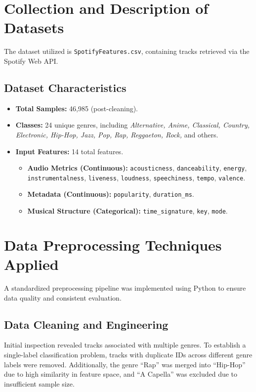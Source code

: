 \documentclass[12pt, a4paper]{article}
\begin{document}
\section{Collection and Description of Datasets}
The dataset utilized is \texttt{SpotifyFeatures.csv}, containing tracks retrieved via the Spotify Web API.

\subsection{Dataset Characteristics}
\begin{itemize}
    \item \textbf{Total Samples:} 46,985 (post-cleaning).
    \item \textbf{Classes:} 24 unique genres, including \textit{Alternative, Anime, Classical, Country, Electronic, Hip-Hop, Jazz, Pop, Rap, Reggaeton, Rock,} and others.
    \item \textbf{Input Features:} 14 total features.
    {\raggedright
    \begin{itemize}
        \item \textbf{Audio Metrics (Continuous):} \texttt{acousticness}, \texttt{danceability}, \texttt{energy}, \texttt{instrumentalness}, \texttt{liveness}, \texttt{loudness}, \texttt{speechiness}, \texttt{tempo}, \texttt{valence}.
        \item \textbf{Metadata (Continuous):} \texttt{popularity}, \texttt{duration\_ms}.
        \item \textbf{Musical Structure (Categorical):} \texttt{time\_signature}, \texttt{key}, \texttt{mode}.
    \end{itemize}
    }
\end{itemize}

\section{Data Preprocessing Techniques Applied}
A standardized preprocessing pipeline was implemented using Python to ensure data quality and consistent evaluation.

\subsection{Data Cleaning and Engineering}
Initial inspection revealed tracks associated with multiple genres. To establish a single-label classification problem, tracks with duplicate IDs across different genre labels were removed. Additionally, the genre ``Rap'' was merged into ``Hip-Hop'' due to high similarity in feature space, and ``A Capella'' was excluded due to insufficient sample size.
\end{document}
